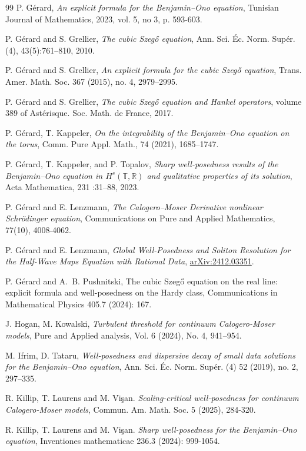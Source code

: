\documentclass [11pt] {article}
\begin{document}
\begin{thebibliography}{99}
 P. Gérard, {\it An explicit formula for the Benjamin--Ono equation}, Tunisian Journal of Mathematics, 2023, vol. 5, no 3, p. 593-603.

 P. G\'erard and S. Grellier, {\it The cubic Szeg\H o equation}, Ann. Sci. Éc. Norm. Supér. (4), 43(5):761--810, 2010.

 P. G\'erard and S. Grellier, {\it An explicit formula for the cubic Szeg\H o equation}, Trans. Amer. Math. Soc. 367 (2015), no. 4, 2979--2995.

 P. Gérard and S. Grellier, {\it The cubic Szeg\H o equation and Hankel operators}, volume 389 of Astérisque. Soc. Math. de France, 2017.

 P. Gérard, T. Kappeler, {\it On the integrability of the Benjamin--Ono equation on the torus}, Comm. Pure Appl. Math., 74 (2021), 1685--1747.

 P. G\'erard, T. Kappeler, and P. Topalov, {\it Sharp well-posedness results of the Benjamin–Ono equation in $H^s(\mathbb{T},\mathbb{R})$  and qualitative properties of its solution}, Acta Mathematica, 231 :31–88, 2023.

 P. G\'erard and E. Lenzmann, {\it The Calogero--Moser Derivative nonlinear Schr\"odinger equation}, Communications on Pure and Applied Mathematics, 77(10), 4008-4062.

  P. G\'erard and E. Lenzmann, {\it Global Well-Posedness and Soliton Resolution for the Half-Wave Maps Equation with Rational Data}, \href{https://arxiv.org/abs/2412.03351}{arXiv:2412.03351}.

 P. G\'erard and A.~B. Pushnitski, The cubic Szeg\H o equation on the real line: explicit formula and well-posedness on the Hardy class, Communications in Mathematical Physics 405.7 (2024): 167.

J. Hogan, M. Kowalski, {\it Turbulent threshold for continuum Calogero-Moser models}, 
Pure and Applied analysis, Vol. 6 (2024), No. 4, 941–954.

 M. Ifrim, D. Tataru, {\it Well-posedness and dispersive decay of small data
solutions for the Benjamin–Ono equation}, Ann. Sci. \'Ec. Norm. Sup\'er. (4) 52 (2019), no. 2, 297--335.

 R. Killip, T. Laurens and M. Vi\c san. {\it Scaling-critical well-posedness for continuum Calogero-Moser models}, Commun. Am. Math. Soc. 5 (2025), 284-320.

 R. Killip, T. Laurens and M. Vi\c san. {\it  Sharp well-posedness for the Benjamin--Ono equation}, Inventiones mathematicae 236.3 (2024): 999-1054.


\end{thebibliography}
\end{document}
